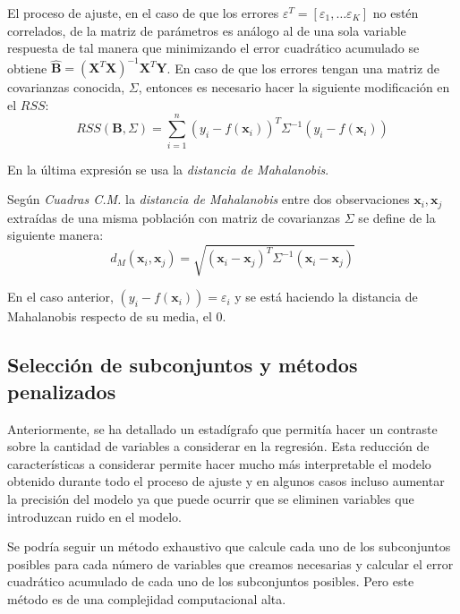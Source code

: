 \noindent El proceso de ajuste, en el caso de que los errores $\varepsilon^T=[\varepsilon_1,\ldots \varepsilon_K]$ no estén correlados, de la matriz de parámetros es análogo al de una sola variable respuesta de tal manera que minimizando el error cuadrático acumulado se obtiene $\hat{\textbf{B}}=(\textbf{X}^T\textbf{X})^{-1}\textbf{X}^T\textbf{Y}$. En caso de que los errores tengan una matriz de covarianzas conocida, $\Sigma$, entonces es necesario hacer la siguiente modificación en el $RSS$:
\begin{equation}
RSS(\textbf{B},\Sigma)=\sum_{i=1}^n(y_i-f(\textbf{x}_i))^T \Sigma^{-1} (y_i-f(\textbf{x}_i))
\end{equation}

\noindent En la última expresión se usa la \textit{distancia de Mahalanobis}.
\begin{defi}
Según \textit{Cuadras C.M.}\cite{Cuadras 2014} la \textit{distancia de Mahalanobis} entre dos observaciones $\textbf{x}_i, \textbf{x}_j$ extraídas de una misma población con matriz de covarianzas $\Sigma$ se define de la siguiente manera: 
\begin{equation}
d_M(\textbf{x}_i, \textbf{x}_j)=\sqrt{(\textbf{x}_i- \textbf{x}_j)^T \Sigma^{-1}(\textbf{x}_i-\textbf{x}_j)}
\end{equation}
\end{defi}

\noindent En el caso anterior, $(y_i-f(\textbf{x}_i))=\varepsilon_i$ y se está haciendo la distancia de Mahalanobis respecto de su media, el 0. 


\subsection{Selección de subconjuntos y métodos penalizados}

\noindent Anteriormente, se ha detallado un estadígrafo que permitía hacer un contraste sobre la cantidad de variables a considerar en la regresión. 
Esta reducción de características a considerar permite hacer mucho más interpretable el modelo obtenido durante todo el proceso de ajuste y en algunos casos incluso aumentar la precisión del modelo ya que puede ocurrir que se eliminen variables que introduzcan ruido en el modelo. 

\noindent Se podría seguir un método exhaustivo que calcule cada uno de los subconjuntos posibles para cada número de variables que creamos necesarias y calcular el error cuadrático acumulado de cada uno de los subconjuntos posibles. Pero este método es de una complejidad computacional alta. 

